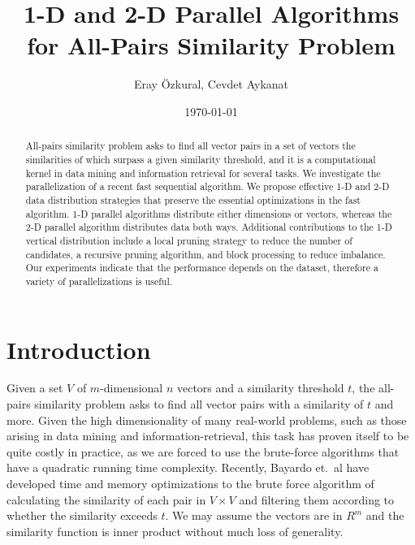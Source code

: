 \documentclass{comjnl}
\begin{document}
\title{1-D and 2-D Parallel Algorithms for All-Pairs Similarity
  Problem}

\author{Eray \"Ozkural, Cevdet Aykanat} 
 \date{\today}


\begin{abstract}
  All-pairs similarity problem asks to find all vector pairs in a set
  of vectors the similarities of which surpass a given similarity
  threshold, and it is a 
  computational kernel in data mining and information retrieval for
  several tasks.
  We investigate the parallelization of a recent fast sequential
  algorithm.
  We propose effective \mbox{1-D} and 2-D data distribution strategies that
  preserve the essential optimizations in the fast algorithm. 1-D
  parallel algorithms distribute either dimensions or
  vectors, whereas the 2-D parallel algorithm distributes data both ways. 
  Additional contributions to
  the 1-D vertical distribution include a local pruning strategy to 
  reduce the number of candidates, a recursive pruning algorithm, 
  and block processing to reduce imbalance.  
  Our
  experiments indicate that the performance depends on the dataset,
  therefore a variety of parallelizations is useful.
\end{abstract}


\maketitle

\section{Introduction}

Given a set $V$ of $m$-dimensional $n$ vectors and a similarity
threshold $t$, the all-pairs similarity problem asks to find all
vector pairs with a similarity of $t$ and more.  Given the high
dimensionality of many real-world problems, such as those arising in
data mining and information-retrieval, this task has proven itself to
be quite costly in practice, as we are forced to use the brute-force
algorithms that have a quadratic running time complexity. Recently,
Bayardo et.~al \cite{Bayardo2007Scaling} have developed time and
memory optimizations to the brute force algorithm of calculating the
similarity of each pair in $V \times V$ and filtering them according
to whether the similarity exceeds $t$.  We may assume the vectors are
in $R^m$ and the similarity function is inner product without much
loss of generality. 
\end{document}

